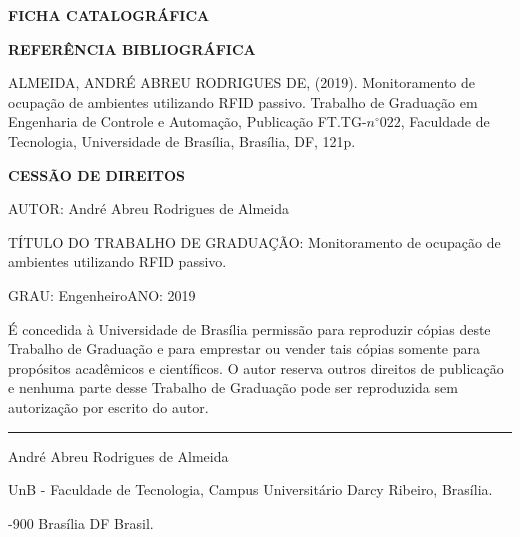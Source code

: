 \noindent \textbf{FICHA CATALOGRÁFICA}

\noindent %

\noindent \medskip{}


\noindent \textbf{REFERÊNCIA BIBLIOGRÁFICA}

ALMEIDA, ANDRÉ ABREU RODRIGUES DE, (2019). Monitoramento de ocupação de ambientes utilizando RFID passivo. Trabalho de Graduação em Engenharia de Controle e Automação, Publicação FT.TG-$n^{\circ}022$,
Faculdade de Tecnologia, Universidade de Brasília, Brasília, DF, 121p.

\noindent \bigskip{}


\noindent \textbf{CESSÃO DE DIREITOS}

\noindent AUTOR: André Abreu Rodrigues de Almeida

TÍTULO DO TRABALHO DE GRADUAÇÃO: Monitoramento de ocupação de ambientes utilizando RFID passivo.

\noindent \medskip{}


\noindent GRAU: Engenheiro\hfill{}ANO: 2019\hfill{}

\noindent \medskip{}


É concedida à Universidade de Brasília permissão para reproduzir cópias
deste Trabalho de Graduação e para emprestar ou vender tais cópias
somente para propósitos acadêmicos e científicos. O autor reserva
outros direitos de publicação e nenhuma parte desse Trabalho de Graduação
pode ser reproduzida sem autorização por escrito do autor.

\noindent \bigskip{}


\noindent \rule[0.5ex]{1\columnwidth}{1pt}

\noindent André Abreu Rodrigues de Almeida

\noindent UnB - Faculdade de Tecnologia, Campus Universitário Darcy Ribeiro, Brasília.

-900 Brasília \textendash{} DF \textendash{} Brasil.

